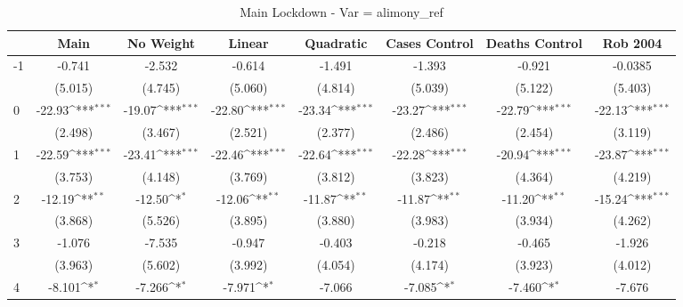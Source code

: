 \documentclass{article}
\begin{document}
{
\def\sym#1{\ifmmode^{#1}\else\(^{#1}\)\fi}
\begin{longtable}{l*{7}{c}}
\caption{Main Lockdown - Var = alimony\_ref}\\
\hline\hline\endfirsthead\hline\endhead\hline\endfoot\endlastfoot
                &\multicolumn{1}{c}{Main}&\multicolumn{1}{c}{No Weight}&\multicolumn{1}{c}{Linear}&\multicolumn{1}{c}{Quadratic}&\multicolumn{1}{c}{Cases Control}&\multicolumn{1}{c}{Deaths Control}&\multicolumn{1}{c}{Rob 2004}\\
\hline
-1              &   -0.741         &   -2.532         &   -0.614         &   -1.491         &   -1.393         &   -0.921         &  -0.0385         \\
                &  (5.015)         &  (4.745)         &  (5.060)         &  (4.814)         &  (5.039)         &  (5.122)         &  (5.403)         \\
0               &   -22.93\sym{***}&   -19.07\sym{***}&   -22.80\sym{***}&   -23.34\sym{***}&   -23.27\sym{***}&   -22.79\sym{***}&   -22.13\sym{***}\\
                &  (2.498)         &  (3.467)         &  (2.521)         &  (2.377)         &  (2.486)         &  (2.454)         &  (3.119)         \\
1               &   -22.59\sym{***}&   -23.41\sym{***}&   -22.46\sym{***}&   -22.64\sym{***}&   -22.28\sym{***}&   -20.94\sym{***}&   -23.87\sym{***}\\
                &  (3.753)         &  (4.148)         &  (3.769)         &  (3.812)         &  (3.823)         &  (4.364)         &  (4.219)         \\
2               &   -12.19\sym{**} &   -12.50\sym{*}  &   -12.06\sym{**} &   -11.87\sym{**} &   -11.87\sym{**} &   -11.20\sym{**} &   -15.24\sym{***}\\
                &  (3.868)         &  (5.526)         &  (3.895)         &  (3.880)         &  (3.983)         &  (3.934)         &  (4.262)         \\
3               &   -1.076         &   -7.535         &   -0.947         &   -0.403         &   -0.218         &   -0.465         &   -1.926         \\
                &  (3.963)         &  (5.602)         &  (3.992)         &  (4.054)         &  (4.174)         &  (3.923)         &  (4.012)         \\
4               &   -8.101\sym{*}  &   -7.266\sym{*}  &   -7.971\sym{*}  &   -7.066         &   -7.085\sym{*}  &   -7.460\sym{*}  &   -7.676         \\

\end{longtable}}
\end{document}

